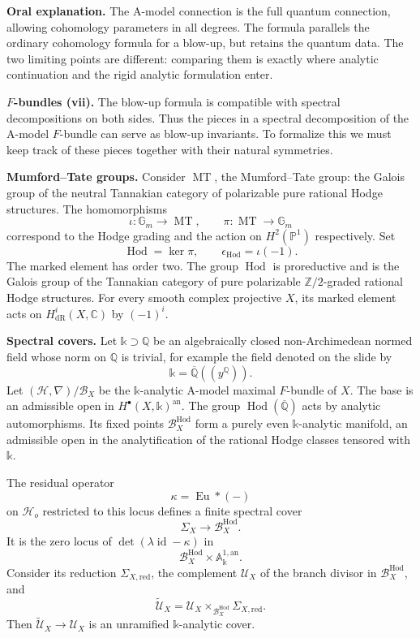 \textbf{Oral explanation.}
The A-model connection is the full quantum
connection, allowing cohomology parameters
in all degrees. The formula parallels the
ordinary cohomology formula for a blow-up,
but retains the quantum data. The two
limiting points are different: comparing
them is exactly where analytic continuation
and the rigid analytic formulation enter.

\medskip\noindent
\textbf{$F$-bundles (vii).}
The blow-up formula is compatible with
spectral decompositions on both sides.
Thus the pieces in a spectral decomposition
of the A-model $F$-bundle can serve as
blow-up invariants. To formalize this we
must keep track of these pieces together
with their natural symmetries.

\medskip\noindent
\textbf{Mumford--Tate groups.}
Consider $\operatorname{MT}$, the
Mumford--Tate group: the Galois group of the
neutral Tannakian category of polarizable
pure rational Hodge structures.
The homomorphisms
$$
\iota:\mathbb G_m\longrightarrow
\operatorname{MT},\qquad
\pi:\operatorname{MT}\longrightarrow
\mathbb G_m
$$
correspond to the Hodge grading and the
action on $H^2(\mathbb P^1)$ respectively.
Set
$$
\operatorname{Hod}=\ker\pi,\qquad
\epsilon_{\operatorname{Hod}}=\iota(-1).
$$
The marked element has order two.
The group $\operatorname{Hod}$ is
proreductive and is the Galois group of the
Tannakian category of pure polarizable
$\mathbb Z/2$-graded rational Hodge
structures. For every smooth complex
projective $X$, its marked element acts on
$H^i_{\mathrm{dR}}(X,\mathbb C)$ by $(-1)^i$.

\medskip\noindent
\textbf{Spectral covers.}
Let $\mathbb k\supset\mathbb Q$ be an
algebraically closed non-Archimedean
normed field whose norm on $\mathbb Q$
is trivial, for example the field denoted
on the slide by
$$
\mathbb k=\overline{\mathbb Q}
((y^{\mathbb Q})).
$$
Let $(\mathcal H,\nabla)/\mathcal B_X$ be
the $\mathbb k$-analytic A-model maximal
$F$-bundle of $X$. The base is an
admissible open in
$H^\bullet(X,\mathbb k)^{\mathrm{an}}$.
The group
$\operatorname{Hod}(\overline{\mathbb Q})$
acts by analytic automorphisms.
Its fixed points
$\mathcal B_X^{\operatorname{Hod}}$ form a
purely even $\mathbb k$-analytic manifold,
an admissible open in the analytification
of the rational Hodge classes tensored with
$\mathbb k$.

The residual operator
$$
\kappa=\operatorname{Eu}*(-)
$$
on $\mathcal H_o$ restricted to this locus
defines a finite spectral cover
$$
\Sigma_X\longrightarrow
\mathcal B_X^{\operatorname{Hod}}.
$$
It is the zero locus of
$\det(\lambda\operatorname{id}-\kappa)$ in
$$
\mathcal B_X^{\operatorname{Hod}}
\times\mathbb A^{1,\mathrm{an}}_{\mathbb k}.
$$
Consider its reduction
$\Sigma_{X,\mathrm{red}}$, the complement
$\mathcal U_X$ of the branch divisor in
$\mathcal B_X^{\operatorname{Hod}}$, and
$$
\widetilde{\mathcal U}_X=
\mathcal U_X\times_{
\mathcal B_X^{\operatorname{Hod}}}
\Sigma_{X,\mathrm{red}}.
$$
Then
$\widetilde{\mathcal U}_X\to\mathcal U_X$
is an unramified $\mathbb k$-analytic cover.


